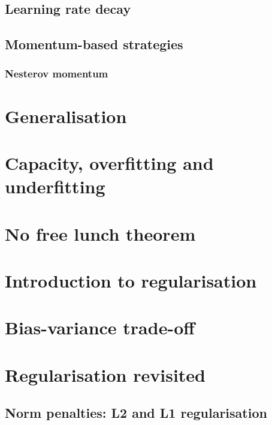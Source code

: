 \subsection{Learning rate decay}
\subsection{Momentum-based strategies}

\subsubsection{Nesterov momentum}

\section{Generalisation}


\section{Capacity, overfitting and underfitting}



\section{No free lunch theorem}


\section{Introduction to regularisation}


\section{Bias-variance trade-off}







\section{Regularisation revisited}
\subsection{Norm penalties: L2 and L1 regularisation}
